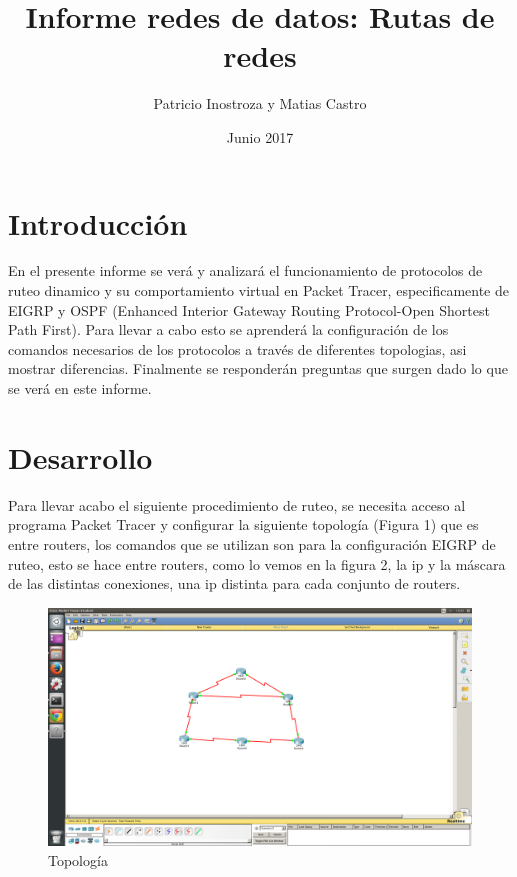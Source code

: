 \documentclass{article}
\title{Informe redes de datos: Rutas de redes}
\author{Patricio Inostroza y Matias Castro }
\date{Junio 2017}
\begin{document}
\begin{titlepage}

\maketitle
\huge


\end{titlepage}

\tableofcontents 
\cleardoublepage

\section{Introducción}
En el presente informe se verá y analizará el funcionamiento de protocolos de ruteo dinamico y su comportamiento virtual en Packet Tracer, especificamente de EIGRP y OSPF (Enhanced Interior Gateway Routing Protocol-Open Shortest Path First). Para llevar a cabo esto se aprenderá la configuración de los comandos necesarios de los protocolos a través de diferentes topologias, asi mostrar diferencias. Finalmente se responderán preguntas que surgen dado lo que se verá en este informe.


\section{Desarrollo}
 
Para llevar acabo el siguiente procedimiento de ruteo, se necesita acceso al programa Packet Tracer y configurar la siguiente topología (Figura 1) que es entre routers, los comandos que se utilizan son para la configuración EIGRP de ruteo, esto se hace entre routers, como lo vemos en la figura 2, la ip y la máscara de las distintas conexiones, una ip distinta para cada conjunto de routers. 

\begin{figure}[h!]
\centering
\includegraphics[scale=0.08]{IMG1}
\caption{Topología}
\end{figure}
\end{document}
